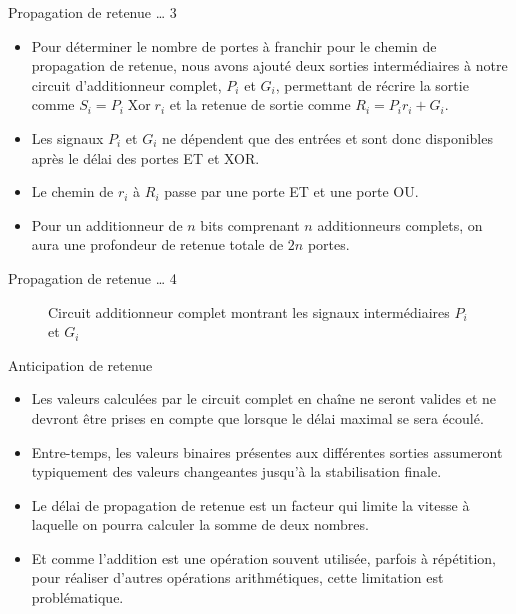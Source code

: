 \documentclass[presentation]{beamer}
\begin{document}
\begin{frame}[label={sec:org4274c0d}]{Propagation de retenue \ldots{} 3}
\begin{itemize}
\item Pour déterminer le nombre de portes à franchir pour le chemin de propagation de retenue, nous avons ajouté deux sorties intermédiaires à notre circuit d'additionneur complet, \(P_i\) et \(G_i\), permettant de récrire la sortie comme \(S_i = P_i \operatorname{Xor} r_i\) et la retenue de sortie comme \(R_i = P_i r_i + G_i\).

\item Les signaux \(P_i\) et \(G_i\) ne dépendent que des entrées et sont donc disponibles après le délai des portes ET et XOR.

\item Le chemin de \(r_i\) à \(R_i\) passe par une porte ET et une porte OU.

\item Pour un additionneur de \(n\) bits comprenant \(n\) additionneurs complets, on aura une profondeur de retenue totale de \(2n\) portes.
\end{itemize}
\end{frame}

\begin{frame}[label={sec:org335244a}]{Propagation de retenue \ldots{} 4}
\begin{figure}[htbp]
\centering

\caption{\label{fig:orgde1b4ca}Circuit additionneur complet montrant les signaux intermédiaires \(P_i\) et \(G_i\)}
\end{figure}
\end{frame}

\begin{frame}[label={sec:orgcb73a3e}]{Anticipation de retenue}
\begin{itemize}
\item Les valeurs calculées par le circuit complet en chaîne ne seront valides et ne devront être prises en compte que lorsque le délai maximal se sera écoulé.

\item Entre-temps, les valeurs binaires présentes aux différentes sorties assumeront typiquement des valeurs changeantes jusqu'à la stabilisation finale.

\item Le délai de propagation de retenue est un facteur qui limite la vitesse à laquelle on pourra calculer la somme de deux nombres.

\item Et comme l'addition est une opération souvent utilisée, parfois à répétition, pour réaliser d'autres opérations arithmétiques, cette limitation est problématique.
\end{itemize}
\end{frame}
\end{document}
